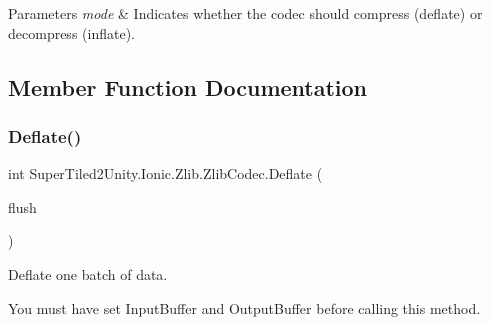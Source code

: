 \begin{DoxyParams}{Parameters}
{\em mode} & Indicates whether the codec should compress (deflate) or decompress (inflate). \\
\hline
\end{DoxyParams}


\subsection{Member Function Documentation}
\mbox{\label{class_super_tiled2_unity_1_1_ionic_1_1_zlib_1_1_zlib_codec_afeb80a3bb4f9bfdbe76e7364d617808c}} 
\subsubsection{\texorpdfstring{Deflate()}{Deflate()}}
{\footnotesize\ttfamily int Super\+Tiled2\+Unity.\+Ionic.\+Zlib.\+Zlib\+Codec.\+Deflate (\begin{DoxyParamCaption}\item[{\mbox{\hyperlink{namespace_super_tiled2_unity_1_1_ionic_1_1_zlib_a2c5853fd63f03c83ac2458da1f4ff3bc}{Flush\+Type}}}]{flush }\end{DoxyParamCaption})}



Deflate one batch of data. 

You must have set Input\+Buffer and Output\+Buffer before calling this method. 


